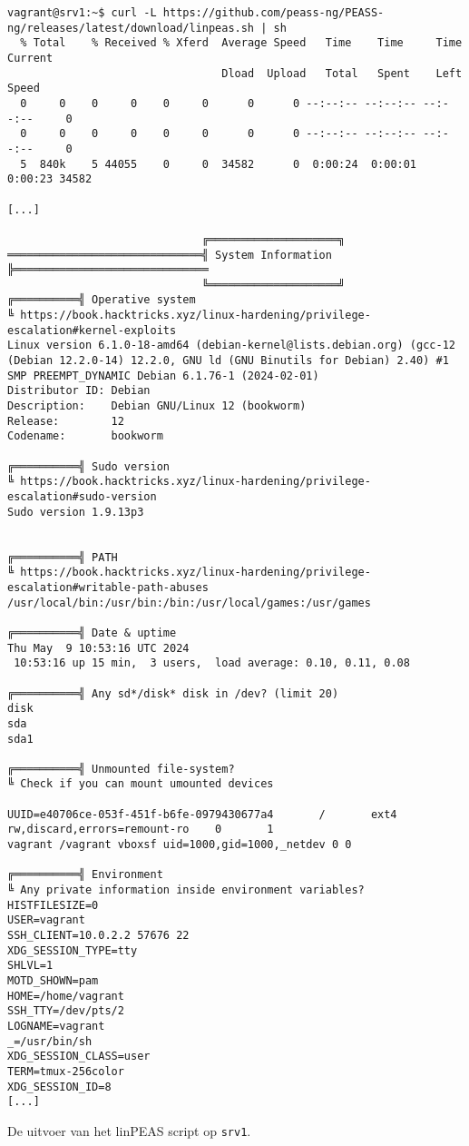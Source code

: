 \begin{longlisting}
  \begin{verbatim}
vagrant@srv1:~$ curl -L https://github.com/peass-ng/PEASS-ng/releases/latest/download/linpeas.sh | sh
  % Total    % Received % Xferd  Average Speed   Time    Time     Time  Current
                                 Dload  Upload   Total   Spent    Left  Speed
  0     0    0     0    0     0      0      0 --:--:-- --:--:-- --:--:--     0
  0     0    0     0    0     0      0      0 --:--:-- --:--:-- --:--:--     0
  5  840k    5 44055    0     0  34582      0  0:00:24  0:00:01  0:00:23 34582

[...]

                              ╔════════════════════╗
══════════════════════════════╣ System Information ╠══════════════════════════════
                              ╚════════════════════╝
╔══════════╣ Operative system
╚ https://book.hacktricks.xyz/linux-hardening/privilege-escalation#kernel-exploits
Linux version 6.1.0-18-amd64 (debian-kernel@lists.debian.org) (gcc-12 (Debian 12.2.0-14) 12.2.0, GNU ld (GNU Binutils for Debian) 2.40) #1 SMP PREEMPT_DYNAMIC Debian 6.1.76-1 (2024-02-01)
Distributor ID: Debian
Description:    Debian GNU/Linux 12 (bookworm)
Release:        12
Codename:       bookworm

╔══════════╣ Sudo version
╚ https://book.hacktricks.xyz/linux-hardening/privilege-escalation#sudo-version
Sudo version 1.9.13p3


╔══════════╣ PATH
╚ https://book.hacktricks.xyz/linux-hardening/privilege-escalation#writable-path-abuses
/usr/local/bin:/usr/bin:/bin:/usr/local/games:/usr/games

╔══════════╣ Date & uptime
Thu May  9 10:53:16 UTC 2024
 10:53:16 up 15 min,  3 users,  load average: 0.10, 0.11, 0.08

╔══════════╣ Any sd*/disk* disk in /dev? (limit 20)
disk
sda
sda1

╔══════════╣ Unmounted file-system?
╚ Check if you can mount umounted devices

UUID=e40706ce-053f-451f-b6fe-0979430677a4       /       ext4    rw,discard,errors=remount-ro    0       1
vagrant /vagrant vboxsf uid=1000,gid=1000,_netdev 0 0

╔══════════╣ Environment
╚ Any private information inside environment variables?
HISTFILESIZE=0
USER=vagrant
SSH_CLIENT=10.0.2.2 57676 22
XDG_SESSION_TYPE=tty
SHLVL=1
MOTD_SHOWN=pam
HOME=/home/vagrant
SSH_TTY=/dev/pts/2
LOGNAME=vagrant
_=/usr/bin/sh
XDG_SESSION_CLASS=user
TERM=tmux-256color
XDG_SESSION_ID=8
[...]
  \end{verbatim}
  \caption[Uitvoer van linPEAS op \texttt{srv1}.]{De uitvoer van het linPEAS script op \texttt{srv1}.}
  \label{lst:bijlage-linpeas}
\end{longlisting}
